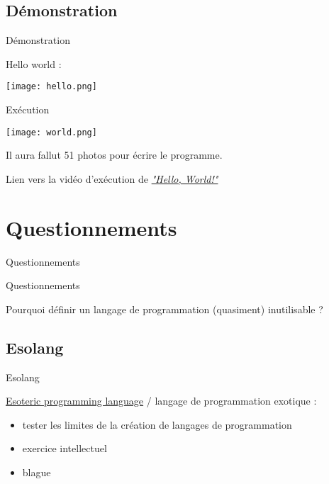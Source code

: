 \documentclass[xcolor={dvipsnames,svgnames}]{beamer}
\begin{document}
\subsection{Démonstration}
\begin{frame}{Démonstration}
	
	Hello world :
	\begin{center}
		\texttt{[image: hello.png]}
	\end{center}
	
\end{frame}

\begin{frame}{Exécution}
	
	\begin{center}
		\texttt{[image: world.png]}
	\end{center}

	Il aura fallut 51 photos pour écrire le programme.

	Lien vers la vidéo d'exécution de \href{https://vimeo.com/102076781}{\emph{"Hello, World!"}}
\end{frame}

\section{Questionnements}
\begin{frame}
	\centering
	\Large Questionnements
\end{frame}

\begin{frame}{Questionnements}
	\begin{center}
		Pourquoi définir un langage de programmation (quasiment) inutilisable ?
	\end{center}
\end{frame}

\subsection{Esolang}
\begin{frame}{Esolang}
	\begin{block}{\href{https://en.wikipedia.org/wiki/Esoteric_programming_language}{Esoteric programming language} / langage de programmation exotique  :}
		\begin{itemize}
			\item tester les limites de la création de langages de programmation
			\item exercice intellectuel
			\item blague
		\end{itemize}
	\end{block}
\end{frame}
\end{document}
